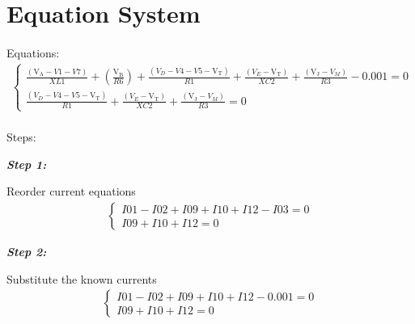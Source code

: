 \documentclass[a4paper]{article}
\begin{document}
\newpage
\section{Equation System}

\paragraph{} Equations:
\begin{gather*}
\begin{cases}\frac{\left(\mathrm{V_{A}}- V1- V7\right)}{ XL1}+\left(\frac{\mathrm{V_{B}}}{ R6}\right)+\frac{\left( V_{D}- V4- V5-\mathrm{V_{T}}\right)}{ R1}+\frac{\left( V_{E}-\mathrm{V_{T}}\right)}{ XC2}+\frac{\left(\mathrm{V_{J}}- V_{M}\right)}{ R3}-0.001 = 0 \\[0.7em] \frac{\left( V_{D}- V4- V5-\mathrm{V_{T}}\right)}{ R1}+\frac{\left( V_{E}-\mathrm{V_{T}}\right)}{ XC2}+\frac{\left(\mathrm{V_{J}}- V_{M}\right)}{ R3} = 0\end{cases}
\end{gather*}
\par

\paragraph{} Steps:

\begin{small}\textbf{\textit{Step 1:}}\end{small}  Reorder current equations
\begin{gather*}
\begin{cases}I01 - I02 + I09 + I10 + I12 - I03 = 0 \\[0.7em] I09 + I10 + I12 = 0\end{cases}
\end{gather*}

\begin{small}\textbf{\textit{Step 2:}}\end{small}  Substitute the known currents
\begin{gather*}
\begin{cases}I01 - I02 + I09 + I10 + I12 - 0.001 = 0 \\[0.7em] I09 + I10 + I12 = 0\end{cases}
\end{gather*}
\end{document}
